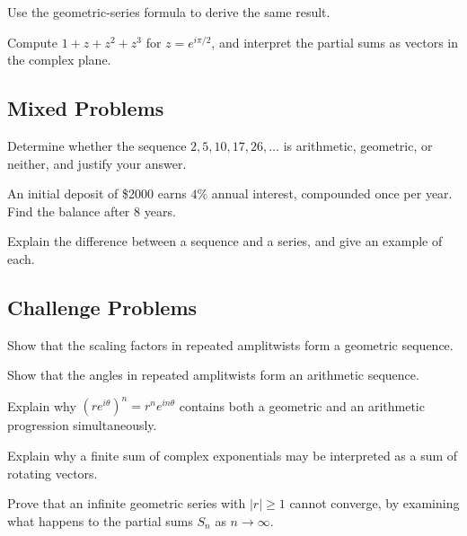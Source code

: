 \begin{exercise}
Use the geometric-series formula to derive the same result.
\end{exercise}

\begin{exercise}
Compute $1+z+z^2+z^3$ for $z=e^{i\pi/2}$, and interpret the partial sums
as vectors in the complex plane.
\end{exercise}

\subsection*{Mixed Problems}
\begin{exercise}
Determine whether the sequence $2, 5, 10, 17, 26, \dots$ is arithmetic,
geometric, or neither, and justify your answer.
\end{exercise}

\begin{exercise}
An initial deposit of \$2000 earns $4\%$ annual interest, compounded
once per year. Find the balance after $8$ years.
\end{exercise}

\begin{exercise}
Explain the difference between a sequence and a series, and give an
example of each.
\end{exercise}

\subsection*{Challenge Problems}
\begin{exercise}
Show that the scaling factors in repeated amplitwists form a geometric
sequence.
\end{exercise}

\begin{exercise}
Show that the angles in repeated amplitwists form an arithmetic
sequence.
\end{exercise}

\begin{exercise}
Explain why $(re^{i\theta})^n = r^ne^{in\theta}$ contains both a
geometric and an arithmetic progression simultaneously.
\end{exercise}

\begin{exercise}
Explain why a finite sum of complex exponentials may be interpreted as a
sum of rotating vectors.
\end{exercise}

\begin{exercise}
Prove that an infinite geometric series with $|r|\ge1$ cannot converge,
by examining what happens to the partial sums $S_n$ as $n\to\infty$.
\end{exercise}
